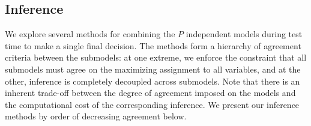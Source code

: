 
\subsection{Inference}\label{sec:stretchable-inference}
We explore several methods for combining the $P$ independent models
during test time to make a single final decision.  The methods form a
hierarchy of agreement criteria between the submodels: at one extreme,
we enforce the constraint that all submodels must agree on the
maximizing assignment to all variables, and at the other, inference is
completely decoupled across submodels. Note that there is an inherent
trade-off between the degree of agreement imposed on the models and the
computational cost of the corresponding inference.  We present our
inference methods by order of decreasing agreement below.

